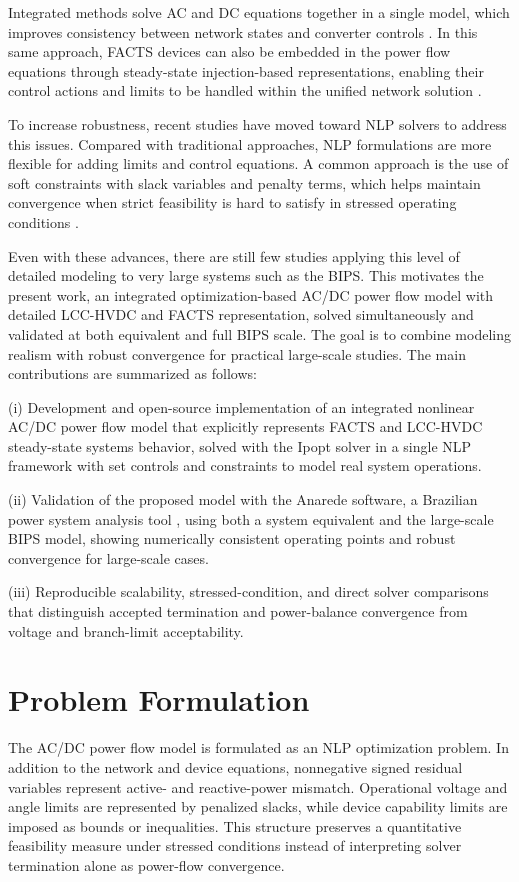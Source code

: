 \documentclass[letterpaper,journal]{IEEEtran}
\begin{document}
Integrated methods solve AC and DC equations together in a single model, which improves consistency between network states and converter
controls \cite{ref5}. In this same approach, FACTS devices can also be embedded in the power flow equations through steady-state
injection-based representations, enabling their control actions and limits to be handled within the unified network solution \cite{ref6}.

To increase robustness, recent studies have moved toward NLP solvers to address this issues. Compared with traditional approaches,
NLP formulations are more flexible for adding limits and control equations. A common approach is the use of soft constraints with
slack variables and penalty terms, which helps maintain convergence when strict feasibility is hard to satisfy in stressed operating
conditions \cite{ref7}.

Even with these advances, there are still few studies applying this level of detailed modeling to very large systems
such as the BIPS. This motivates the present work, an integrated optimization-based AC/DC power flow model with detailed
LCC-HVDC and FACTS representation, solved simultaneously and validated at both equivalent and full BIPS scale. The goal
is to combine modeling realism with robust convergence for practical large-scale studies. The main contributions are summarized as follows:

(i) Development and open-source implementation of an integrated nonlinear AC/DC power flow model that explicitly represents
 FACTS and LCC-HVDC steady-state systems behavior, solved with the Ipopt solver \cite{ref8} in a single NLP framework with
 set controls and constraints to model real system operations.

(ii) Validation of the proposed model with the Anarede software, a Brazilian power system analysis tool \cite{ref9},
using both a system equivalent and the large-scale BIPS model, showing numerically consistent operating points and robust
convergence for large-scale cases.

(iii) Reproducible scalability, stressed-condition, and direct solver comparisons that distinguish accepted termination and
power-balance convergence from voltage and branch-limit acceptability.
\section{Problem Formulation}
The AC/DC power flow model is formulated as an NLP optimization problem. In addition to the network and device equations, nonnegative signed
residual variables represent active- and reactive-power mismatch. Operational voltage and angle limits are represented by penalized slacks,
while device capability limits are imposed as bounds or inequalities. This structure preserves a quantitative feasibility measure under
stressed conditions instead of interpreting solver termination alone as power-flow convergence.
\end{document}
